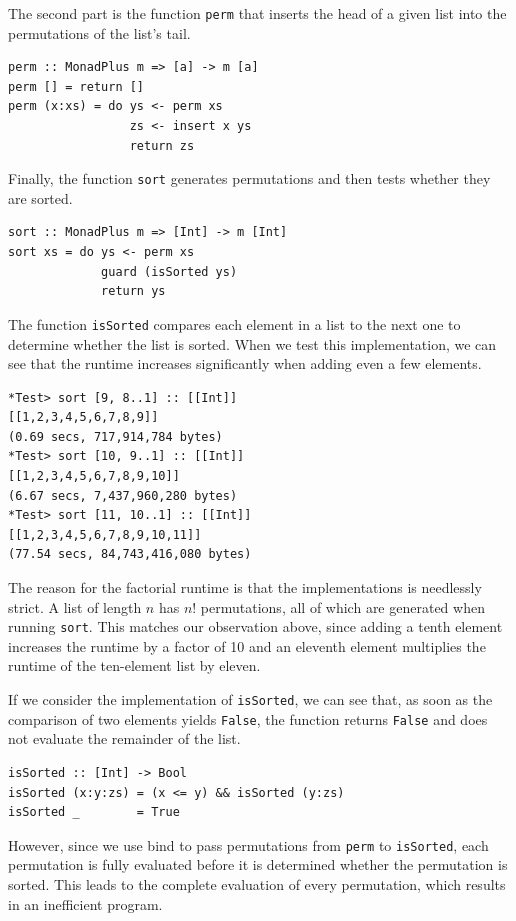 \documentclass[a4paper, 11pt, fleqn, twoside]{scrreprt}
\newcommand{\hinl}[1]{\texttt{#1}}
\begin{document}
The second part is the function \hinl{perm} that inserts the 
head of a given list into the permutations of the list's tail.
\begin{verbatim}
perm :: MonadPlus m => [a] -> m [a]
perm [] = return []
perm (x:xs) = do ys <- perm xs
                 zs <- insert x ys
                 return zs
\end{verbatim}

Finally, the function \hinl{sort} generates permutations and 
then tests whether they are sorted.

\begin{verbatim}
sort :: MonadPlus m => [Int] -> m [Int]
sort xs = do ys <- perm xs
             guard (isSorted ys)
             return ys
\end{verbatim}

The function \hinl{isSorted} compares each element in a list to 
the next one to determine whether the list is sorted. When we test this 
implementation, we can see that the runtime increases significantly when adding 
even a few elements.

\begin{verbatim}
*Test> sort [9, 8..1] :: [[Int]]
[[1,2,3,4,5,6,7,8,9]]
(0.69 secs, 717,914,784 bytes)
*Test> sort [10, 9..1] :: [[Int]]
[[1,2,3,4,5,6,7,8,9,10]]
(6.67 secs, 7,437,960,280 bytes)
*Test> sort [11, 10..1] :: [[Int]]
[[1,2,3,4,5,6,7,8,9,10,11]]
(77.54 secs, 84,743,416,080 bytes)
\end{verbatim}

The reason for the factorial runtime is that the implementations is needlessly 
strict. A list of length $n$  has $n!$ permutations, all of which are generated 
when running \hinl{sort}. This matches our observation above, 
since adding a tenth element increases the runtime by a factor of 10 and an 
eleventh element multiplies the runtime of the ten-element list by eleven. 

If we consider the implementation of \hinl{isSorted}, we can see 
that, as soon as the comparison of two elements yields 
\hinl{False}, the function returns \hinl{False} 
and does not evaluate the remainder of the list.

\begin{verbatim}
isSorted :: [Int] -> Bool
isSorted (x:y:zs) = (x <= y) && isSorted (y:zs)
isSorted _        = True
\end{verbatim}

However, since we use bind to pass permutations from \hinl{perm} 
to \hinl{isSorted}, each permutation is fully evaluated before 
it is determined whether the permutation is sorted. This leads to the complete 
evaluation of every permutation, which results in an inefficient program.
\end{document}
